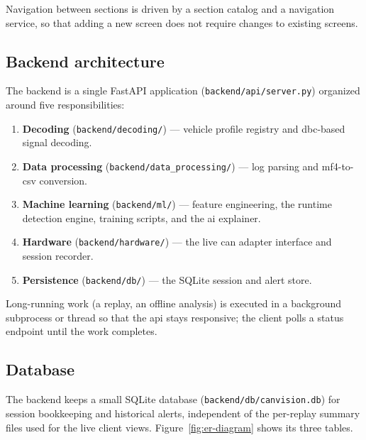 Navigation between sections is driven by a section catalog and a navigation service, so that adding a new screen does not require changes to existing screens.

\subsection{Backend architecture}

The backend is a single FastAPI application (\texttt{backend/api/server.py}) organized around five responsibilities:

\begin{enumerate}
    \item \textbf{Decoding} (\texttt{backend/decoding/}) — vehicle profile registry and \gls{dbc}-based signal decoding.
    \item \textbf{Data processing} (\texttt{backend/data\_processing/}) — log parsing and \gls{mf4}-to-\gls{csv} conversion.
    \item \textbf{Machine learning} (\texttt{backend/ml/}) — feature engineering, the runtime detection engine, training scripts, and the \gls{ai} explainer.
    \item \textbf{Hardware} (\texttt{backend/hardware/}) — the live \gls{can} adapter interface and session recorder.
    \item \textbf{Persistence} (\texttt{backend/db/}) — the SQLite session and alert store.
\end{enumerate}

Long-running work (a replay, an offline analysis) is executed in a background subprocess or thread so that the \gls{api} stays responsive; the client polls a status endpoint until the work completes.

\subsection{Database}

The backend keeps a small SQLite database (\texttt{backend/db/canvision.db}) for session bookkeeping and historical alerts, independent of the per-replay summary files used for the live client views. Figure~\ref{fig:er-diagram} shows its three tables.

